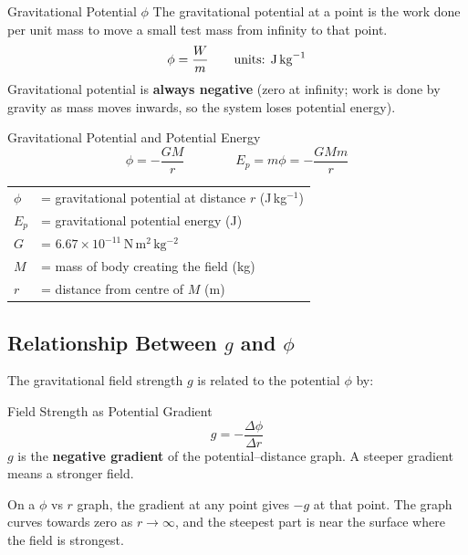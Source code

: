 \begin{defnbox}{Gravitational Potential $\phi$}
The gravitational potential at a point is the work done per unit mass to move a small
test mass from infinity to that point.
\[
  \phi = \frac{W}{m} \qquad \text{units: J\,kg}^{-1}
\]
Gravitational potential is \textbf{always negative} (zero at infinity; work is done
by gravity as mass moves inwards, so the system loses potential energy).
\end{defnbox}

\begin{formulabox}{Gravitational Potential and Potential Energy}
\begin{equation}
  \phi = -\frac{GM}{r} \qquad \qquad E_p = m\phi = -\frac{GMm}{r}
\end{equation}
\begin{tabular}{ll}
$\phi$ & = gravitational potential at distance $r$ (J\,kg$^{-1}$) \\
$E_p$  & = gravitational potential energy (J) \\
$G$    & = $6.67\times10^{-11}\,\mathrm{N\,m^2\,kg^{-2}}$ \\
$M$    & = mass of body creating the field (kg) \\
$r$    & = distance from centre of $M$ (m) \\
\end{tabular}
\end{formulabox}

\subsection{Relationship Between $g$ and $\phi$}

The gravitational field strength $g$ is related to the potential $\phi$ by:

\begin{formulabox}{Field Strength as Potential Gradient}
\begin{equation}
  g = -\frac{\Delta\phi}{\Delta r}
\end{equation}
$g$ is the \textbf{negative gradient} of the potential–distance graph. A steeper
gradient means a stronger field.
\end{formulabox}

\begin{tipbox}
On a $\phi$ vs $r$ graph, the gradient at any point gives $-g$ at that point.
The graph curves towards zero as $r \to \infty$, and the steepest part is near
the surface where the field is strongest.
\end{tipbox}

